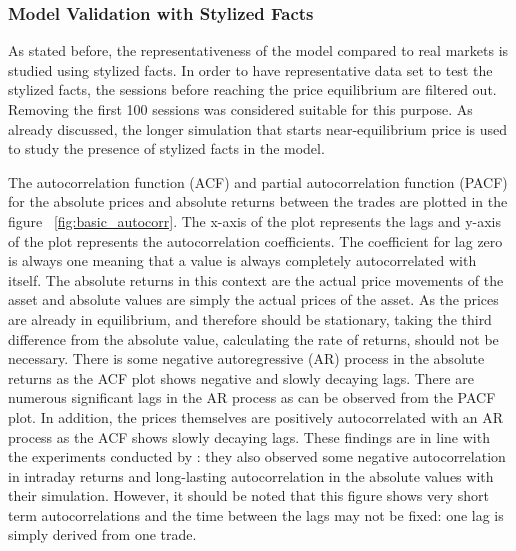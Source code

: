 \subsubsection{Model Validation with Stylized Facts}
As stated before, the representativeness of the model compared to real markets 
is studied using stylized facts. In order to have representative data set to 
test the stylized facts, the sessions before reaching the price equilibrium are filtered out.
Removing the first 100 sessions was considered suitable for this purpose. 
As already discussed, the longer simulation that starts near-equilibrium 
price is used to study the presence of stylized facts in the model. 

The autocorrelation function (ACF) and partial autocorrelation function (PACF) for the absolute prices and absolute returns between
the trades are plotted in the figure ~\ref{fig:basic_autocorr}. The x-axis of the plot represents the lags and y-axis of the plot represents the 
autocorrelation coefficients. The coefficient for lag zero is always one meaning that a value is always completely autocorrelated with itself. 
The absolute returns in this context are the actual price movements of 
the asset and absolute values are simply the actual prices of the asset. As the prices are already in equilibrium, and therefore should be 
stationary, taking the third difference from the absolute value, calculating the rate of returns, should not be necessary. There is some negative 
autoregressive (AR) process in the absolute returns as the ACF plot shows negative and slowly decaying lags. There are numerous 
significant lags in the AR process as can be observed from the PACF plot. In addition, the prices themselves are 
positively autocorrelated with an AR process as the ACF shows slowly decaying lags. These findings are in line with the experiments conducted by \citet{Raberto05}: 
they also observed some negative autocorrelation in intraday returns and long-lasting autocorrelation in the absolute
values with their simulation. However, it should be noted that this figure shows very short term
autocorrelations and the time between the lags may not be fixed: one lag is simply derived from one
trade. 



